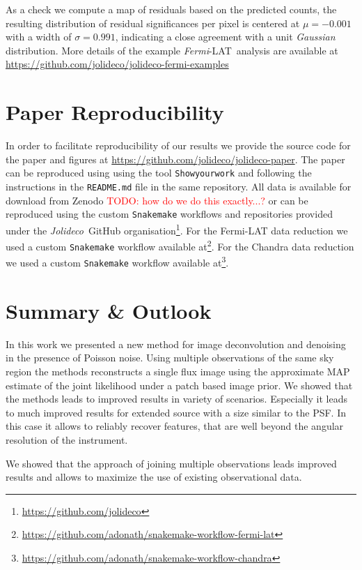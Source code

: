 \documentclass[twocolumn]{aastex631}
\newcommand{\fermi}{\textit{Fermi}-LAT~}
\newcommand{\jolideco}{\textit{Jolideco}~}
\newcommand{\todo}[1]{\textcolor{red}{TODO: #1}\PackageWarning{TODO:}{#1!}}
\begin{document}
    As a check we compute a map of residuals based on the predicted counts, the resulting distribution of residual significances per pixel is centered at $\mu=-0.001$ with a width of $\sigma=0.991$, indicating a close agreement with a unit \textit{Gaussian} distribution. More details of the example \fermi analysis are available at \url{https://github.com/jolideco/jolideco-fermi-examples}
    

    \section{Paper Reproducibility}
    \label{sec:reproducibility}
    In order to facilitate reproducibility of our results we provide the source code for the paper and figures at \url{https://github.com/jolideco/jolideco-paper}. The paper can be reproduced using using the tool \texttt{Showyourwork} \citep{Luger2021} and following the instructions in the \texttt{README.md} file in the same repository. All data is available for download from Zenodo \todo{how do we do this exactly...?} or can be reproduced using the custom  \texttt{Snakemake} workflows and repositories provided under the \jolideco GitHub organisation\footnote{\url{https://github.com/jolideco}}. For the Fermi-LAT data reduction we used a custom \texttt{Snakemake} workflow  available at\footnote{\url{https://github.com/adonath/snakemake-workflow-fermi-lat}}. For the Chandra data reduction we used a custom \texttt{Snakemake} workflow available at\footnote{\url{https://github.com/adonath/snakemake-workflow-chandra}}.
        
    
    \section{Summary \& Outlook}
    In this work we presented a new method for image deconvolution and denoising in the presence of Poisson noise. Using multiple observations of the same sky region the methods reconstructs a single flux image using the approximate MAP estimate of the joint likelihood under a patch based image prior. We showed that the methods leads to improved results in variety of scenarios. Especially it leads to much improved results for extended source with a size similar to the PSF. In this case it allows to reliably recover features, that are well beyond the angular resolution of the instrument.

    We showed that the approach of joining multiple observations leads improved results and allows to maximize the use of existing observational data.
\end{document}
